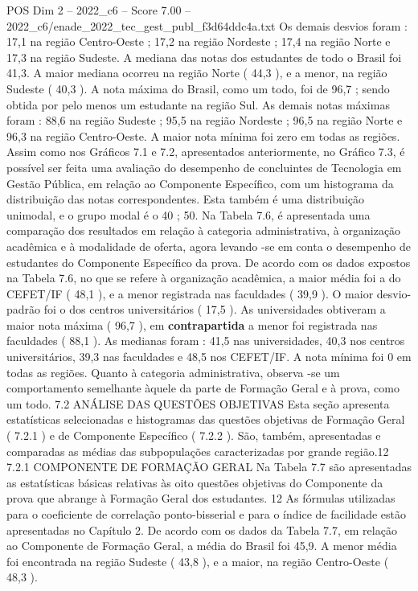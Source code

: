 \begin{textsample}{POS Dim 2 – 2022\_c6 – Score 7.00 – 2022\_c6/enade\_2022\_tec\_gest\_publ\_f3d64ddc4a.txt}
Os demais desvios foram : 17,1 na região Centro-Oeste ; 17,2 na região Nordeste ; 17,4 na região Norte e 17,3 na região Sudeste.
A mediana das notas dos estudantes de todo o Brasil foi 41,3.
A maior mediana ocorreu na região Norte ( 44,3 ), e a menor, na região Sudeste ( 40,3 ).
A nota máxima do Brasil, como um todo, foi de 96,7 ; sendo obtida por pelo menos um estudante na região Sul.
As demais notas máximas foram : 88,6 na região Sudeste ; 95,5 na região Nordeste ; 96,5 na região Norte e 96,3 na região Centro-Oeste.
A maior nota mínima foi zero em todas as regiões.
Assim como nos Gráficos 7.1 e 7.2, apresentados anteriormente, no Gráfico 7.3, é possível ser feita uma avaliação do desempenho de concluintes de Tecnologia em Gestão Pública, em relação ao Componente Específico, com um histograma da distribuição das notas correspondentes.
Esta também é uma distribuição unimodal, e o grupo modal é o 40 ; 50.
Na Tabela 7.6, é apresentada uma comparação dos resultados em relação à categoria administrativa, à organização acadêmica e à modalidade de oferta, agora levando -se em conta o desempenho de estudantes do Componente Específico da prova.
De acordo com os dados expostos na Tabela 7.6, no que se refere à organização acadêmica, a maior média foi a do CEFET/IF ( 48,1 ), e a menor registrada nas faculdades ( 39,9 ).
O maior desvio-padrão foi o dos centros universitários ( 17,5 ).
As universidades obtiveram a maior nota máxima ( 96,7 ), em \textbf{contrapartida} a menor foi registrada nas faculdades ( 88,1 ).
As medianas foram : 41,5 nas universidades, 40,3 nos centros universitários, 39,3 nas faculdades e 48,5 nos CEFET/IF.
A nota mínima foi 0 em todas as regiões.
Quanto à categoria administrativa, observa -se um comportamento semelhante àquele da parte de Formação Geral e à prova, como um todo. 7.2 ANÁLISE DAS QUESTÕES OBJETIVAS Esta seção apresenta estatísticas selecionadas e histogramas das questões objetivas de Formação Geral ( 7.2.1 ) e de Componente Específico ( 7.2.2 ).
São, também, apresentadas e comparadas as médias das subpopulações caracterizadas por grande região.12 7.2.1 COMPONENTE DE FORMAÇÃO GERAL Na Tabela 7.7 são apresentadas as estatísticas básicas relativas às oito questões objetivas do Componente da prova que abrange à Formação Geral dos estudantes. 12 As fórmulas utilizadas para o coeficiente de correlação ponto-bisserial e para o índice de facilidade estão apresentadas no Capítulo 2.
De acordo com os dados da Tabela 7.7, em relação ao Componente de Formação Geral, a média do Brasil foi 45,9.
A menor média foi encontrada na região Sudeste ( 43,8 ), e a maior, na região Centro-Oeste ( 48,3 ).

\end{textsample}
